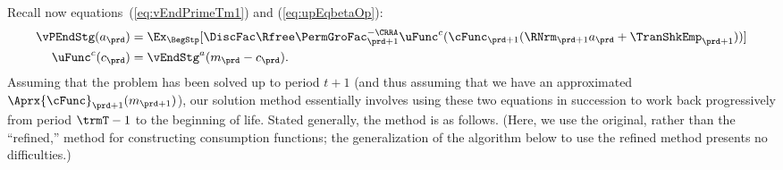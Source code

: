 \documentclass[\econtexRoot/SolvingMicroDSOPs]{subfiles}
\begin{document}
Recall now equations~(\ref{eq:vEndPrimeTm1}) and (\ref{eq:upEqbetaOp}):
\begin{equation*}\begin{gathered}\begin{aligned}
      \vPEndStg({a}_{\prd})  & = \Ex_{\BegStp}[\DiscFac \Rfree \PermGroFac_{\prd+1}^{-\CRRA}
      \uFunc^{{c}}(\cFunc_{\prd+1}(\RNrm_{\prd+1} {a}_{\prd}+{\TranShkEmp}_{\prd+1}))]
      \\\uFunc^{{c}}({c}_{\prd})   & = \vEndStg^{{a}}({m}_{\prd}-{c}_{\prd}).
    \end{aligned}\end{gathered}\end{equation*}
Assuming that the problem has been solved up to period $t+1$ (and thus assuming that we have an approximated $\Aprx{\cFunc}_{\prd+1}({m}_{\prd+1})$), our solution method essentially involves using these two equations in succession to work back progressively from period $\trmT-1$ to the beginning of life.  Stated generally, the method is as follows.  (Here, we use the original, rather than the ``refined,'' method for constructing consumption functions; the generalization of the algorithm below to use the refined method presents no difficulties.)
\end{document}
